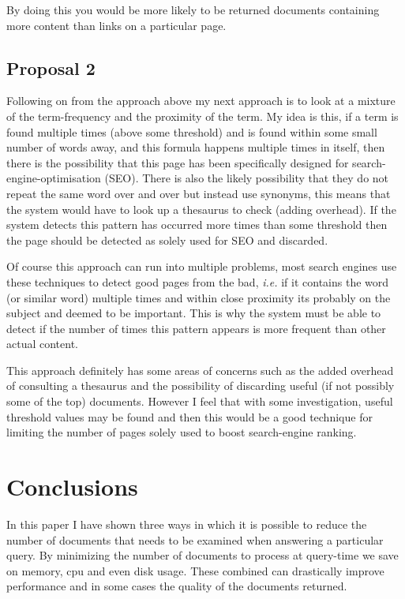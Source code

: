\documentclass{acm_proc_article-sp}
\begin{document}
By doing this you would be more likely to be returned documents containing more content than links on a particular page.

\subsection{Proposal 2}

Following on from the approach above my next approach is to look at a mixture of the term-frequency and the proximity of the term. My idea is this, if a term is found multiple times (above some threshold) and is found within some small number of words away, and this formula happens multiple times in itself, then there is the possibility that this page has been specifically designed for search-engine-optimisation (SEO). There is also the likely possibility that they do not repeat the same word over and over but instead use synonyms, this means that the system would have to look up a thesaurus to check (adding overhead). If the system detects this pattern has occurred more times than some threshold then the page should be detected as solely used for SEO and discarded.

Of course this approach can run into multiple problems, most search engines use these techniques to detect good pages from the bad, \emph{i.e.} if it contains the word (or similar word) multiple times and within close proximity its probably on the subject and deemed to be important. This is why the system must be able to detect if the number of times this pattern appears is more frequent than other actual content.

This approach definitely has some areas of concerns such as the added overhead of consulting a thesaurus and the possibility of discarding useful (if not possibly some of the top) documents. However I feel that with some investigation, useful threshold values may be found and then this would be a good technique for limiting the number of pages solely used to boost search-engine ranking.

\section{Conclusions}
In this paper I have shown three ways in which it is possible to reduce the number of documents that needs to be examined when answering a particular query. By minimizing the number of documents to process at query-time we save on memory, cpu and even disk usage. These combined can drastically improve performance and in some cases the quality of the documents returned. 
\end{document}
